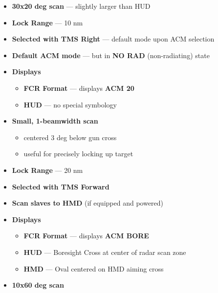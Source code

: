 \begin{tcoloritemize}
    \begin{itemize}
        \item \textbf{30x20 deg scan} --- slightly larger than HUD
        \item \textbf{Lock Range} --- 10 nm
        \item \textbf{Selected with TMS Right} --- default mode upon ACM selection
        \item \textbf{Default ACM mode} --- but in \textbf{NO RAD} (non-radiating) state
        \item \textbf{Displays}
        \begin{itemize}
            \item \textbf{FCR Format} --- displays \textbf{ACM 20}
            \item \textbf{HUD} --- no special symbology
        \end{itemize}
    \end{itemize}
    \begin{itemize}
        \item \textbf{Small, 1-beamwidth scan}
        \begin{itemize}
            \item centered 3 deg below gun cross
            \item useful for precisely locking up target
        \end{itemize}
        \item \textbf{Lock Range} --- 20 nm
        \item \textbf{Selected with TMS Forward}
        \item \textbf{Scan slaves to HMD} (if equipped and powered)
        \item \textbf{Displays}
        \begin{itemize}
            \item \textbf{FCR Format} --- displays \textbf{ACM BORE}
            \item \textbf{HUD} --- Boresight Cross at center of radar scan zone
            \item \textbf{HMD} --- Oval centered on HMD aiming cross
        \end{itemize}
    \end{itemize}
    \begin{itemize}
        \item \textbf{10x60 deg scan}
        \begin{itemize}

\end{itemize}
\end{itemize}
\end{tcoloritemize}
